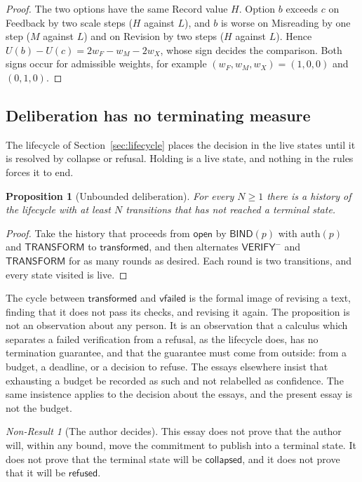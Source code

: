\documentclass[11pt]{article}
\theoremstyle{plain}
\newtheorem{proposition}[theorem]{Proposition}
\theoremstyle{definition}
\theoremstyle{remark}
\newtheorem{nonresult}[theorem]{Non-Result}
\begin{document}
\begin{proof}
The two options have the same Record value $H$. Option $b$ exceeds $c$ on Feedback by two scale steps ($H$ against $L$), and $b$ is worse on Misreading by one step ($M$ against $L$) and on Revision by two steps ($H$ against $L$). Hence $U(b)-U(c)=2w_F-w_M-2w_X$, whose sign decides the comparison. Both signs occur for admissible weights, for example $(w_F,w_M,w_X)=(1,0,0)$ and $(0,1,0)$. \qedhere
\end{proof}

\subsection{Deliberation has no terminating measure}

The lifecycle of Section~\ref{sec:lifecycle} places the decision in the live states until it is resolved by collapse or refusal. Holding is a live state, and nothing in the rules forces it to end.

\begin{proposition}[Unbounded deliberation]\label{prop:unbounded}
For every $N\ge1$ there is a history of the lifecycle with at least $N$ transitions that has not reached a terminal state.
\end{proposition}

\begin{proof}
Take the history that proceeds from $\mathsf{open}$ by $\mathsf{BIND}(p)$ with $\mathrm{auth}(p)$ and $\mathsf{TRANSFORM}$ to $\mathsf{transformed}$, and then alternates $\mathsf{VERIFY}^{-}$ and $\mathsf{TRANSFORM}$ for as many rounds as desired. Each round is two transitions, and every state visited is live. \qedhere
\end{proof}

The cycle between $\mathsf{transformed}$ and $\mathsf{vfailed}$ is the formal image of revising a text, finding that it does not pass its checks, and revising it again. The proposition is not an observation about any person. It is an observation that a calculus which separates a failed verification from a refusal, as the lifecycle does, has no termination guarantee, and that the guarantee must come from outside: from a budget, a deadline, or a decision to refuse. The essays elsewhere insist that exhausting a budget be recorded as such and not relabelled as confidence. The same insistence applies to the decision about the essays, and the present essay is not the budget.

\begin{nonresult}[The author decides]\label{nr:decides}
This essay does not prove that the author will, within any bound, move the commitment to publish into a terminal state. It does not prove that the terminal state will be $\mathsf{collapsed}$, and it does not prove that it will be $\mathsf{refused}$.
\end{nonresult}
\end{document}
